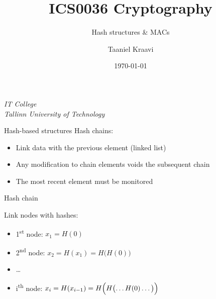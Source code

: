 \graphicspath{ {../../images/} }
\usetikzlibrary{external,overlay-beamer-styles}
\usepackage{caption}

\title{ICS0036 Cryptography}
\subtitle{Hash structures \& MACs}
\date{\today}
\author{Taaniel Kraavi}
\institute%
{%
  \textit{IT College}\\
  \textit{Tallinn University of Technology}
}


\begin{frame}
  \titlepage
\end{frame}

\begin{frame}{Hash-based structures}
  Hash chains:
  \begin{itemize}[<+(1)->]
    \item Link data with the previous element (linked list)
    \item Any modification to chain elements voids the subsequent chain
    \item The most recent element must be monitored
  \end{itemize}
\end{frame}

\begin{frame}{Hash chain}
  \begin{center}
  \end{center}

  \pause
  Link nodes with hashes:
  \begin{itemize}[<+(1)->]
    \item 1\textsuperscript{st} node: $x_1 = H(0)$
    \item 2\textsuperscript{nd} node: $x_2 = H(x_1) = H\bigl(H(0)\bigr)$
    \item \dots
    \item i\textsuperscript{th} node: $x_i = H(x_{i-1}) = H\Bigl(H\bigl(\dots H(0)\dots\bigr)\Bigr)$
  \end{itemize}
\end{frame}

